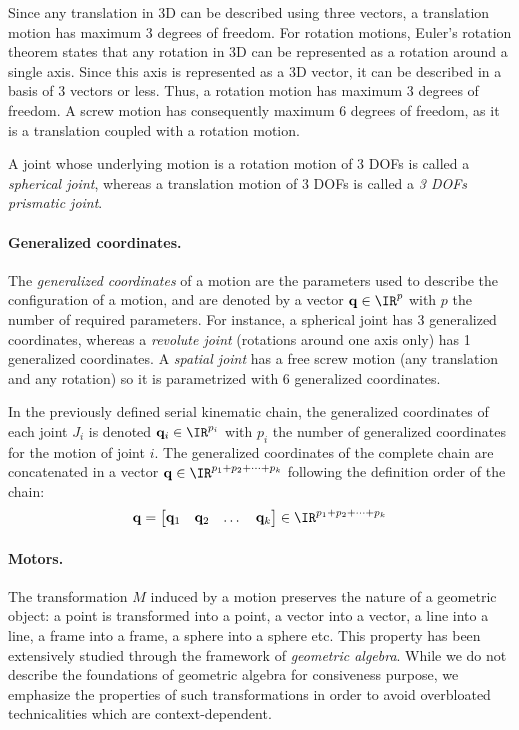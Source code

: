 Since any translation in 3D can be described using three vectors, a translation motion has maximum 3 degrees of freedom. For rotation motions, Euler's rotation theorem states that any rotation in 3D can be represented as a rotation around a single axis. Since this axis is represented as a 3D vector, it can be described in a basis of 3 vectors or less. Thus, a rotation motion has maximum 3 degrees of freedom. A screw motion has consequently maximum 6 degrees of freedom, as it is a translation coupled with a rotation motion.

A joint whose underlying motion is a rotation motion of 3 DOFs is called a \emph{spherical joint}, whereas a translation motion of 3 DOFs is called a \emph{3 DOFs prismatic joint}.

\paragraph*{Generalized coordinates.} The \emph{generalized coordinates} of a motion are the parameters used to describe the configuration of a motion, and are denoted by a vector $\mathbf{q}\in\IR^p$ with $p$ the number of required parameters. For instance, a spherical joint has 3 generalized coordinates, whereas a \emph{revolute joint} (rotations around one axis only) has 1 generalized coordinates. A \emph{spatial joint} has a free screw motion (any translation and any rotation) so it is parametrized with 6 generalized coordinates.

In the previously defined serial kinematic chain, the generalized coordinates of each joint $J_i$ is denoted $\mathbf{q}_i\in\IR^{p_i}$ with $p_i$ the number of generalized coordinates for the motion of joint $i$. The generalized coordinates of the complete chain are concatenated in a vector $\mathbf{q}\in \IR^{p_1+p_2+\dots + p_k}$ following the definition order of the chain:
$$\mathbf{q} = \begin{bmatrix}
    \mathbf{q}_1 &  \mathbf{q}_2 & \dots & \mathbf{q}_k
\end{bmatrix}\in \IR^{p_1+p_2+\dots + p_k}$$


\paragraph*{Motors.} The transformation $M$ induced by a motion preserves the nature of a geometric object: a point is transformed into a point, a vector into a vector, a line into a line, a frame into a frame, a sphere into a sphere etc. This property has been extensively studied through the framework of \emph{geometric algebra}. While we do not describe the foundations of geometric algebra for consiveness purpose, we emphasize the properties of such transformations in order to avoid overbloated technicalities which are context-dependent.

